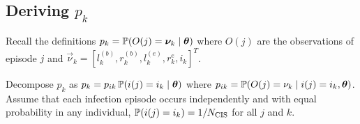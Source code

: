 \documentclass[thesis.tex]{subfiles}
\begin{document}

\subsection{Deriving $p_k$}

Recall the definitions $p_k = \operatorname{\mathbb{P}}(O(j) = \bm{\nu}_k \mid \bm{\theta})$ where $O(j)$ are the observations of episode $j$ and $\vec{\nu}_k = [l^{(b)}_k, r^{(b)}_k, l^{(e)}_k, r^{e}_k, i_k]^T$.

Decompose $p_k$ as $p_k = p_{ik} \operatorname{\mathbb{P}}(i(j) = i_k \mid \bm{\theta})$
where $p_{ik} = \operatorname{\mathbb{P}}(O(j) = \nu_k \mid i(j) = i_k, \bm{\theta})$.
Assume that each infection episode occurs independently and with equal probability in any individual, \ie $\operatorname{\mathbb{P}}(i(j) = i_k) = 1/N_\text{CIS}$ for all $j$ and $k$.
\end{document}
